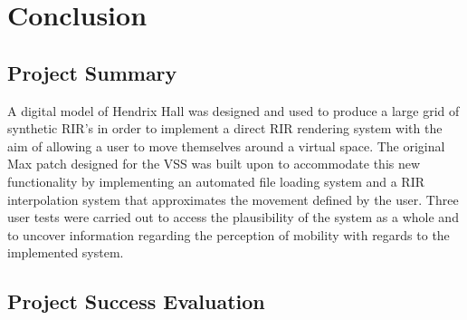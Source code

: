 \documentclass[../../main.tex]{subfiles}
\begin{document}
	\section{Conclusion}
	
		\subsection{Project Summary}
		A digital model of Hendrix Hall was designed and used to produce a large grid of synthetic \ac{RIR}'s in order to implement a direct \ac{RIR} rendering system with the aim of allowing a user to move themselves around a virtual space. The original Max patch designed for the \ac{VSS} was built upon to accommodate this new functionality by implementing an automated file loading system and a \ac{RIR} interpolation system that approximates the movement defined by the user. Three user tests were carried out to access the plausibility of the system as a whole and to uncover information regarding the perception of mobility with regards to the implemented system. 







		\subsection{Project Success Evaluation}
\end{document}
